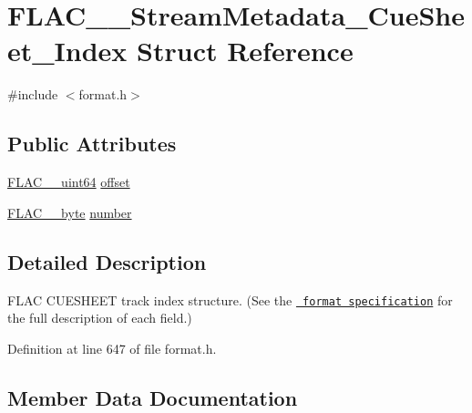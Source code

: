 \hypertarget{struct_f_l_a_c_____stream_metadata___cue_sheet___index}{}\section{F\+L\+A\+C\+\_\+\+\_\+\+Stream\+Metadata\+\_\+\+Cue\+Sheet\+\_\+\+Index Struct Reference}
\label{struct_f_l_a_c_____stream_metadata___cue_sheet___index}


{\ttfamily \#include $<$format.\+h$>$}

\subsection*{Public Attributes}
\begin{DoxyCompactItemize}
\item 
\mbox{\hyperlink{ordinals_8h_aa78c8c70a3eb8a58af7436f278acde8e}{F\+L\+A\+C\+\_\+\+\_\+uint64}} \mbox{\hyperlink{struct_f_l_a_c_____stream_metadata___cue_sheet___index_ac221421bca83976925e2a41438157bb9}{offset}}
\item 
\mbox{\hyperlink{ordinals_8h_a5eb569b12d5b047cdacada4d57924ee3}{F\+L\+A\+C\+\_\+\+\_\+byte}} \mbox{\hyperlink{struct_f_l_a_c_____stream_metadata___cue_sheet___index_a71edc33c19a749f1dfb3d1429e08c77a}{number}}
\end{DoxyCompactItemize}


\subsection{Detailed Description}
F\+L\+AC C\+U\+E\+S\+H\+E\+ET track index structure. (See the \href{../format.html\#cuesheet_track_index}{\texttt{ format specification}} for the full description of each field.) 

Definition at line 647 of file format.\+h.



\subsection{Member Data Documentation}
\mbox{\label{struct_f_l_a_c_____stream_metadata___cue_sheet___index_a71edc33c19a749f1dfb3d1429e08c77a}} 

